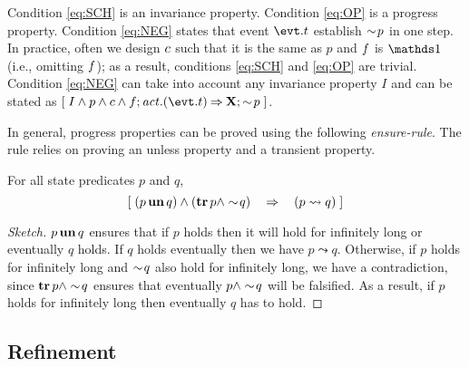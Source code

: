Condition \eqref{eq:SCH} is an invariance property. Condition
\eqref{eq:OP} is a progress property.  Condition \eqref{eq:NEG} states
that event $\evt.t$ establish $\sim \! p$ in one step.  In practice,
often we design $c$ such that it is the same as $p$ and
$f$ is $\one$ (i.e., omitting $f$); as a result,
conditions \eqref{eq:SCH} and \eqref{eq:OP} are trivial.  Condition
\eqref{eq:NEG} can take into account any invariance property $I$ and
can be stated as $\ew{I \land p \land \csched \land \fsched;
  \action.(\evt.t) \limp \X; \spneg p}$.

In general, progress properties can be proved using the following
\emph{ensure-rule}.  The rule relies on proving an unless property and
a transient property.
\begin{Theorem} For all state predicates $p$ and $q$,
  \label{thm:ensure-rule}
  \begin{equation}
    \label{eq:ensure-rule}
    [\; (p \mathop{\textbf{un}} q) \land (\mathop{\textbf{tr}} p \land \sim \! q)  ~~~\mathbin\Rightarrow~~~ (p \leadsto q) \;]
  \end{equation}
\end{Theorem}
\begin{proof}[Sketch]
  $p \mathop{\textbf{un}} q$ ensures that if $p$ holds then it will hold for infinitely long or
  eventually $q$ holds.  If $q$ holds eventually then we have $p
  \leadsto q$.  Otherwise, if $p$ holds for infinitely long and $\sim \! q$
  also hold for infinitely long, we have a contradiction, since $\mathop{\textbf{tr}} p \land
  \sim \! q$ ensures that eventually $p \land \sim \! q$ will be
  falsified.  As a result, if $p$ holds for infinitely long then eventually
  $q$ has to hold.
\end{proof}

\subsection{Refinement}
\label{sec:refinement}

